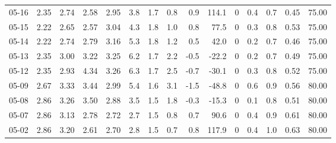 \begin{threeparttable}
{\begin{tabular}{lrrrrrrrrrrrrrr}
  05-16 &          2.35 &          2.74 &          2.58 &        2.95 &                 3.8 &                1.7 &                 0.8 &        0.9 &        114.1 &              0 &                 0.4 &              0.7 &            0.45 &                  75.00 \\
  05-15 &          2.22 &          2.65 &          2.57 &        3.04 &                 4.3 &                1.8 &                 1.0 &        0.8 &         77.5 &              0 &                 0.3 &              0.8 &            0.53 &                  75.00 \\
  05-14 &          2.22 &          2.74 &          2.79 &        3.16 &                 5.3 &                1.8 &                 1.2 &        0.5 &         42.0 &              0 &                 0.2 &              0.7 &            0.46 &                  75.00 \\
  05-13 &          2.35 &          3.00 &          3.22 &        3.25 &                 6.2 &                1.7 &                 2.2 &       -0.5 &        -22.2 &              0 &                 0.2 &              0.7 &            0.49 &                  75.00 \\
  05-12 &          2.35 &          2.93 &          4.34 &        3.26 &                 6.3 &                1.7 &                 2.5 &       -0.7 &        -30.1 &              0 &                 0.3 &              0.8 &            0.52 &                  75.00 \\
  05-09 &          2.67 &          3.33 &          3.44 &        2.99 &                 5.4 &                1.6 &                 3.1 &       -1.5 &        -48.8 &              0 &                 0.6 &              0.9 &            0.56 &                  80.00 \\
  05-08 &          2.86 &          3.26 &          3.50 &        2.88 &                 3.5 &                1.5 &                 1.8 &       -0.3 &        -15.3 &              0 &                 0.1 &              0.8 &            0.51 &                  80.00 \\
  05-07 &          2.86 &          3.13 &          2.78 &        2.72 &                 2.7 &                1.5 &                 0.8 &        0.7 &         90.6 &              0 &                 0.4 &              0.9 &            0.61 &                  80.00 \\
  05-02 &          2.86 &          3.20 &          2.61 &        2.70 &                 2.8 &                1.5 &                 0.7 &        0.8 &        117.9 &              0 &                 0.4 &              1.0 &            0.63 &                  80.00 \\

\end{tabular}}
\end{threeparttable}
